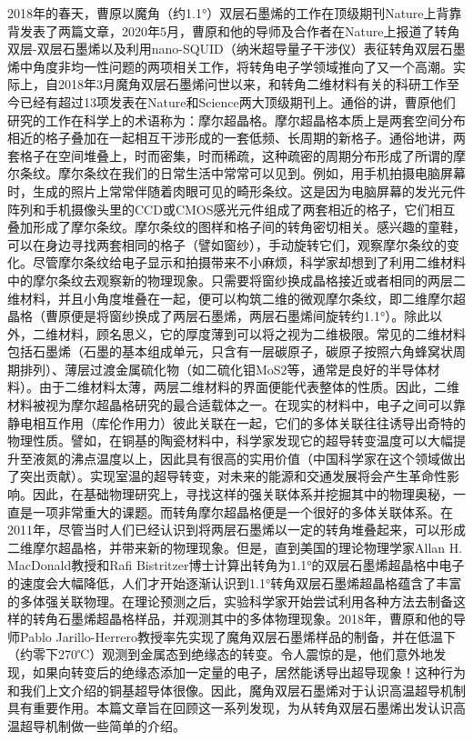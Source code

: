 \documentclass[hyperref,a4paper,UTF8]{ctexart}
\begin{document}
2018年的春天，曹原以魔角（约1.1°）双层石墨烯的工作在顶级期刊Nature上背靠背发表了两篇文章，2020年5月，曹原和他的导师及合作者在Nature上报道了转角双层-双层石墨烯以及利用nano-SQUID（纳米超导量子干涉仪）表征转角双层石墨烯中角度非均一性问题的两项相关工作，将转角电子学领域推向了又一个高潮。实际上，自2018年3月魔角双层石墨烯问世以来，和转角二维材料有关的科研工作至今已经有超过13项发表在Nature和Science两大顶级期刊上。通俗的讲，曹原他们研究的工作在科学上的术语称为：摩尔超晶格。摩尔超晶格本质上是两套空间分布相近的格子叠加在一起相互干涉形成的一套低频、长周期的新格子。通俗地讲，两套格子在空间堆叠上，时而密集，时而稀疏，这种疏密的周期分布形成了所谓的摩尔条纹。摩尔条纹在我们的日常生活中常常可以见到。例如，用手机拍摄电脑屏幕时，生成的照片上常常伴随着肉眼可见的畸形条纹。这是因为电脑屏幕的发光元件阵列和手机摄像头里的CCD或CMOS感光元件组成了两套相近的格子，它们相互叠加形成了摩尔条纹。摩尔条纹的图样和格子间的转角密切相关。感兴趣的童鞋，可以在身边寻找两套相同的格子（譬如窗纱），手动旋转它们，观察摩尔条纹的变化。尽管摩尔条纹给电子显示和拍摄带来不小麻烦，科学家却想到了利用二维材料中的摩尔条纹去观察新的物理现象。只需要将窗纱换成晶格接近或者相同的两层二维材料，并且小角度堆叠在一起，便可以构筑二维的微观摩尔条纹，即二维摩尔超晶格（曹原便是将窗纱换成了两层石墨烯，两层石墨烯间旋转约1.1°）。除此以外，二维材料，顾名思义，它的厚度薄到可以将之视为二维极限。常见的二维材料包括石墨烯（石墨的基本组成单元，只含有一层碳原子，碳原子按照六角蜂窝状周期排列）、薄层过渡金属硫化物（如二硫化钼MoS2等，通常是良好的半导体材料）。由于二维材料太薄，两层二维材料的界面便能代表整体的性质。因此，二维材料被视为摩尔超晶格研究的最合适载体之一。在现实的材料中，电子之间可以靠静电相互作用（库伦作用力）彼此关联在一起，它们的多体关联往往诱导出奇特的物理性质。譬如，在铜基的陶瓷材料中，科学家发现它的超导转变温度可以大幅提升至液氮的沸点温度以上，因此具有很高的实用价值（中国科学家在这个领域做出了突出贡献）。实现室温的超导转变，对未来的能源和交通发展将会产生革命性影响。因此，在基础物理研究上，寻找这样的强关联体系并挖掘其中的物理奥秘，一直是一项非常重大的课题。而转角摩尔超晶格便是一个很好的多体关联体系。在2011年，尽管当时人们已经认识到将两层石墨烯以一定的转角堆叠起来，可以形成二维摩尔超晶格，并带来新的物理现象。但是，直到美国的理论物理学家Allan H. MacDonald教授和Rafi Bistritzer博士计算出转角为1.1°的双层石墨烯超晶格中电子的速度会大幅降低，人们才开始逐渐认识到1.1°转角双层石墨烯超晶格蕴含了丰富的多体强关联物理。在理论预测之后，实验科学家开始尝试利用各种方法去制备这样的转角石墨烯超晶格样品，并观测其中的多体物理现象。2018年，曹原和他的导师Pablo Jarillo-Herrero教授率先实现了魔角双层石墨烯样品的制备，并在低温下（约零下270℃）观测到金属态到绝缘态的转变。令人震惊的是，他们意外地发现，如果向转变后的绝缘态添加一定量的电子，居然能诱导出超导现象！这种行为和我们上文介绍的铜基超导体很像。因此，魔角双层石墨烯对于认识高温超导机制具有重要作用。本篇文章旨在回顾这一系列发现，为从转角双层石墨烯出发认识高温超导机制做一些简单的介绍。
\end{document}
